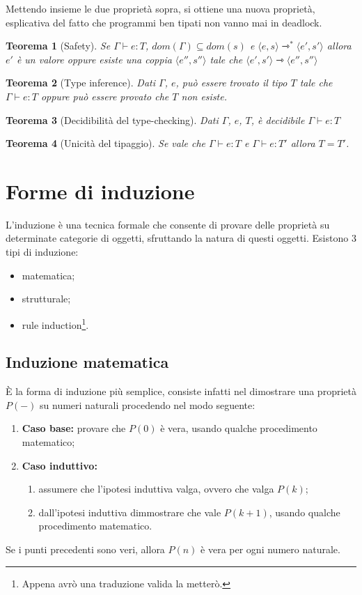\documentclass[a4paper, 11pt]{article}
\newtheorem{thm}{Teorema}[section]
\newcommand{\type}{\Gamma \vdash}
\begin{document}
Mettendo insieme le due proprietà sopra, si ottiene una nuova proprietà, esplicativa del fatto che programmi ben tipati non vanno mai in deadlock.

\begin{thm}[Safety]
	Se $\type e:T$, $dom(\Gamma) \subseteq dom(s)$ e $\langle e,s \rangle \rightarrowtriangle^\ast \langle e',s' \rangle$ allora $e'$ è un valore oppure esiste una coppia $\langle e'', s'' \rangle$ tale che $\langle e',s' \rangle \rightarrowtriangle \langle e'',s'' \rangle$
\end{thm}

\begin{thm}[Type inference]
	Dati $\Gamma$, $e$, può essere trovato il tipo $T$ tale che $\type e:T$ oppure può essere provato che $T$ non esiste.
\end{thm}

\begin{thm}[Decidibilità del type-checking]
	Dati $\Gamma$, $e$, $T$, è decidibile $\type e:T$
\end{thm}

\begin{thm}[Unicità del tipaggio]
	Se vale che $\type e:T$ e $\type e:T'$ allora $T=T'$.
\end{thm}

\newpage
\section{Forme di induzione}
L'induzione è una tecnica formale che consente di provare delle proprietà su determinate categorie di oggetti, sfruttando la natura di questi oggetti.
Esistono 3 tipi di induzione:
\begin{itemize}
	\item matematica;
	\item strutturale;
	\item rule induction\footnote{Appena avrò una traduzione valida la metterò.}.
\end{itemize}

\subsection{Induzione matematica}
È la forma di induzione più semplice, consiste infatti nel dimostrare una proprietà $P(-)$ su numeri naturali procedendo nel modo seguente:
\begin{enumerate}
\item \textbf{Caso base:} provare che $P(0)$ è vera, usando qualche procedimento matematico;
\item \textbf{Caso induttivo:}\begin{enumerate}
	\item assumere che l'ipotesi induttiva valga, ovvero che valga $P(k)$;
	\item dall'ipotesi induttiva dimmostrare che vale $P(k+1)$, usando qualche procedimento matematico.
\end{enumerate}
\end{enumerate}
Se i punti precedenti sono veri, allora $P(n)$ è vera per ogni numero naturale.
\end{document}
